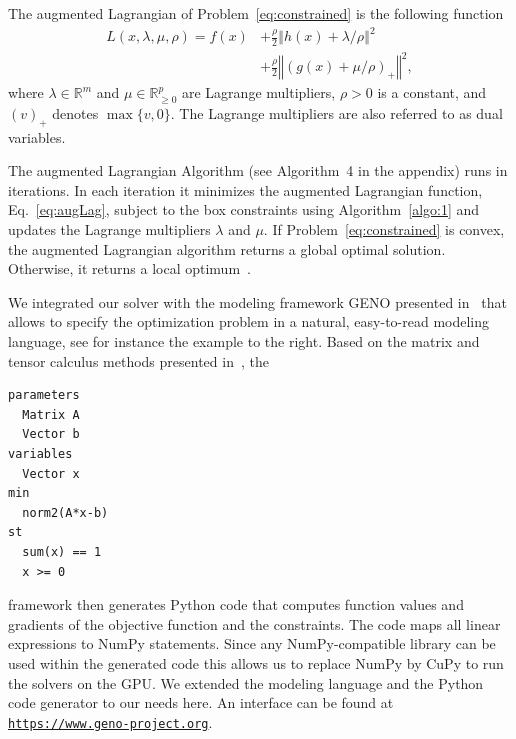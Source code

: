 \documentclass[letterpaper]{article} %
\newcommand{\setR}{\mathbb{R}}
\newcommand{\norm}[1]{\left\Vert#1\right\Vert}
\begin{document}
The augmented Lagrangian of Problem~\eqref{eq:constrained} is the
following function
\begin{equation}
\label{eq:augLag}
\begin{aligned}
  L (x, \lambda, \mu, \rho) = f(x) & + \frac{\rho}{2}
  \norm{h(x)+\lambda /\rho}^2 \\
  & + \frac{\rho}{2} \norm{\left(g(x)
    + \mu /\rho\right)_+}^2,
\end{aligned}
\end{equation}
where $\lambda\in\setR^m$ and $\mu\in\setR_{\geq 0}^p$ are Lagrange
multipliers, \mbox{$\rho >0$} is a constant, and $(v)_+$ denotes $\max\{v, 0\}$. The Lagrange multipliers are also referred to as dual variables.

The augmented Lagrangian Algorithm (see Algorithm~4 in the appendix) runs in iterations. In each iteration it minimizes the augmented Lagrangian function, Eq.~\eqref{eq:augLag}, subject to the box constraints using Algorithm~\ref{algo:1} and updates the Lagrange multipliers $\lambda$ and $\mu$. If Problem~\eqref{eq:constrained} is convex, the augmented Lagrangian algorithm returns a global optimal solution. Otherwise, it returns a local optimum~\cite{Bertsekas99}.

\noindent
\begin{minipage}{0.5\columnwidth}
We integrated our solver with the modeling framework GENO presented in~\cite{LaueMG2019} that allows to specify the optimization problem in a natural, easy-to-read modeling language, see for instance the example to the right. Based on the matrix and tensor calculus methods presented in~\cite{LaueMG2018,LaueMG2020}, \hfill the
\end{minipage}
\hfill
\begin{minipage}{0.4\columnwidth}
  \begin{Verbatim}[frame=single]
parameters
  Matrix A
  Vector b
variables
  Vector x
min
  norm2(A*x-b)
st
  sum(x) == 1
  x >= 0
  \end{Verbatim}
\vfill
\end{minipage}
framework then generates Python
code that computes function values and gradients of the objective function and the constraints.
The code maps all linear expressions to NumPy statements. Since any NumPy-compatible library can be used within the generated code this allows us to replace NumPy by CuPy to run the solvers on the GPU. We extended the modeling language and the Python code generator to our needs here. An interface can be found at \href{https://www.geno-project.org}{\texttt{https://www.geno-project.org}}.%
\end{document}
